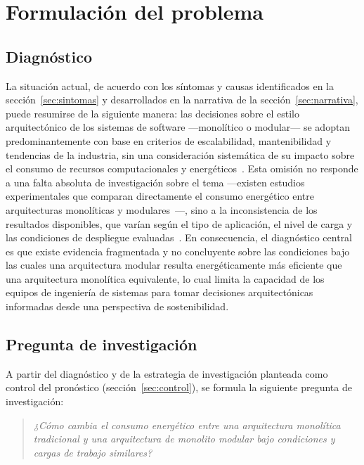 \section{Formulación del problema}
\label{sec:formulacion}

\subsection{Diagnóstico}
\label{sec:diagnostico}

La situación actual, de acuerdo con los síntomas y causas identificados en la sección~\ref{sec:sintomas} y desarrollados en la narrativa de la sección~\ref{sec:narrativa}, puede resumirse de la siguiente manera: las decisiones sobre el estilo arquitectónico de los sistemas de software ---monolítico o modular--- se adoptan predominantemente con base en criterios de escalabilidad, mantenibilidad y tendencias de la industria, sin una consideración sistemática de su impacto sobre el consumo de recursos computacionales y energéticos~\cite{khan2020cloud}. Esta omisión no responde a una falta absoluta de investigación sobre el tema ---existen estudios experimentales que comparan directamente el consumo energético entre arquitecturas monolíticas y modulares~\cite{capuano2026comparative}---, sino a la inconsistencia de los resultados disponibles, que varían según el tipo de aplicación, el nivel de carga y las condiciones de despliegue evaluadas~\cite{araujo2024energy}. En consecuencia, el diagnóstico central es que existe evidencia fragmentada y no concluyente sobre las condiciones bajo las cuales una arquitectura modular resulta energéticamente más eficiente que una arquitectura monolítica equivalente, lo cual limita la capacidad de los equipos de ingeniería de sistemas para tomar decisiones arquitectónicas informadas desde una perspectiva de sostenibilidad.

\subsection{Pregunta de investigación}
\label{sec:pregunta}

A partir del diagnóstico y de la estrategia de investigación planteada como control del pronóstico (sección~\ref{sec:control}), se formula la siguiente pregunta de investigación:

\begin{quote}
\textit{¿Cómo cambia el consumo energético entre una arquitectura monolítica tradicional y una arquitectura de monolito modular bajo condiciones y cargas de trabajo similares?}
\end{quote}

